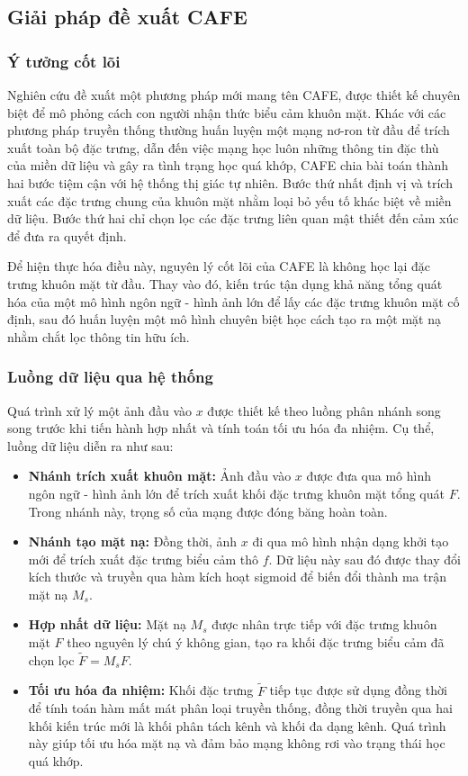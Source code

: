 \subsection{Giải pháp đề xuất CAFE}

\subsubsection{Ý tưởng cốt lõi}

Nghiên cứu đề xuất một phương pháp mới mang tên CAFE, được thiết kế chuyên biệt để mô phỏng cách con người nhận thức biểu cảm khuôn mặt. Khác với các phương pháp truyền thống thường huấn luyện một mạng nơ-ron từ đầu để trích xuất toàn bộ đặc trưng, dẫn đến việc mạng học luôn những thông tin đặc thù của miền dữ liệu và gây ra tình trạng học quá khớp, CAFE chia bài toán thành hai bước tiệm cận với hệ thống thị giác tự nhiên. Bước thứ nhất định vị và trích xuất các đặc trưng chung của khuôn mặt nhằm loại bỏ yếu tố khác biệt về miền dữ liệu. Bước thứ hai chỉ chọn lọc các đặc trưng liên quan mật thiết đến cảm xúc để đưa ra quyết định.

Để hiện thực hóa điều này, nguyên lý cốt lõi của CAFE là không học lại đặc trưng khuôn mặt từ đầu. Thay vào đó, kiến trúc tận dụng khả năng tổng quát hóa của một mô hình ngôn ngữ - hình ảnh lớn để lấy các đặc trưng khuôn mặt cố định, sau đó huấn luyện một mô hình chuyên biệt học cách tạo ra một mặt nạ nhằm chắt lọc thông tin hữu ích.

\subsubsection{Luồng dữ liệu qua hệ thống}

Quá trình xử lý một ảnh đầu vào $x$ được thiết kế theo luồng phân nhánh song song trước khi tiến hành hợp nhất và tính toán tối ưu hóa đa nhiệm. Cụ thể, luồng dữ liệu diễn ra như sau:

\begin{itemize}
    \item \textbf{Nhánh trích xuất khuôn mặt:} Ảnh đầu vào $x$ được đưa qua mô hình ngôn ngữ - hình ảnh lớn để trích xuất khối đặc trưng khuôn mặt tổng quát $F$. Trong nhánh này, trọng số của mạng được đóng băng hoàn toàn.
    \item \textbf{Nhánh tạo mặt nạ:} Đồng thời, ảnh $x$ đi qua mô hình nhận dạng khởi tạo mới để trích xuất đặc trưng biểu cảm thô $f$. Dữ liệu này sau đó được thay đổi kích thước và truyền qua hàm kích hoạt sigmoid để biến đổi thành ma trận mặt nạ $M_s$.
    \item \textbf{Hợp nhất dữ liệu:} Mặt nạ $M_s$ được nhân trực tiếp với đặc trưng khuôn mặt $F$ theo nguyên lý chú ý không gian, tạo ra khối đặc trưng biểu cảm đã chọn lọc $\tilde{F} = M_sF$.
    \item \textbf{Tối ưu hóa đa nhiệm:} Khối đặc trưng $\tilde{F}$ tiếp tục được sử dụng đồng thời để tính toán hàm mất mát phân loại truyền thống, đồng thời truyền qua hai khối kiến trúc mới là khối phân tách kênh và khối đa dạng kênh. Quá trình này giúp tối ưu hóa mặt nạ và đảm bảo mạng không rơi vào trạng thái học quá khớp.
\end{itemize}

